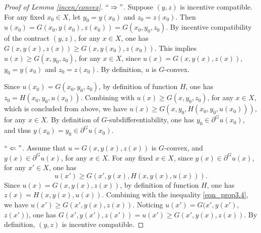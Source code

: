 \documentclass[a4paper, 11pt]{amsart}
\numberwithin{equation}{section}
\theoremstyle{plain}
\theoremstyle{definition}
\theoremstyle{remark}
\begin{document}
\vspace{0.3cm}
\begin{proof}[Proof of Lemma \ref{incen/convex}]
$``\Rightarrow"$. Suppose $(y,z)$ is incentive compatible. For any fixed $x_0 \in X$, let $y_0 = y(x_0)$ and $z_0 = z(x_0)$. Then $u(x_0) = G(x_0, y(x_0), z(x_0)) = G(x_0, y_0, z_0)$. By incentive compatibility of the contract $(y,z)$, for any $x\in X$, one has $G(x, y(x), z(x)) \ge G(x, y(x_0), z(x_0))$. This implies $u(x) \ge G(x,y_0,z_0)$, for any $x\in X$, since $u(x)= G(x, y(x), z(x))$,  $y_0 = y(x_0)$ and $z_0 = z(x_0)$. By definition, $u$ is $G$-convex. 

Since $u(x_0)=G(x_0, y_0, z_0)$, by definition of function $H$, one has $z_0 = H(x_0, y_0, u(x_0))$.  Combining with $u(x) \ge G(x, y_0, z_0)$,  for any $x\in X$, which is concluded from above, we have $u(x)\ge G(x, y_0, H(x_0, y_0, u(x_0)))$, for any $x\in X$. By definition of  $G$-subdifferentiability, one has $y_0 \in \partial^G u(x_0)$, and thus $y(x_0) = y_0 \in \partial^G u(x_0)$.

$``\Leftarrow"$. Assume that $u = G(x, y(x),z(x))$ is $G$-convex, and $y(x)\in \partial^G u(x)$, for any $x\in X$. For any fixed $x \in X$, since $y(x)\in \partial^G u(x)$, for any $x'\in X$, one has 
\begin{equation}\label{eqn_prop3.4}
	u(x')\ge G(x', y(x), H(x, y(x), u(x))).
\end{equation} 
Since $u(x) = G(x, y(x),z(x))$, by definition of function $H$, one has $z(x) = H(x,y(x), u(x))$. Combining with the inequality \eqref{eqn_prop3.4}, we have $u(x')\ge G(x', y(x), z(x))$. Noticing $u(x') = G(x',y(x'),$ $z(x')) $, one has $G(x',y(x'),z(x')) = u(x') \ge G(x', y(x), z(x))$.
By definition, $(y,z)$ is incentive compatible.
\end{proof}

\vspace{0.3cm}
\end{document}
